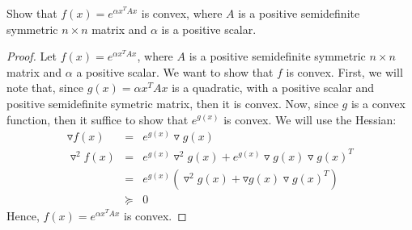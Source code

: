 \begin{prob}[2.1]
  Show that $f(x) = e^{\alpha x^{T}Ax}$ is convex, where $A$ is a 
  positive semidefinite symmetric $n \times n$ matrix and $\alpha$
  is a positive scalar.
\end{prob}
\begin{proof}
  Let $f(x) = e^{\alpha x^{T}Ax}$, where $A$ is a positive semidefinite symmetric
  $n \times n$ matrix and $\alpha$ a positive scalar. We want to show that $f$
  is convex.  First, we will note that, since $g(x) = \alpha x^{T}Ax$ is a quadratic, with a positive scalar and positive semidefinite symetric matrix, then it is convex.  Now, since $g$ is a convex function, then it suffice to show that $e^{g(x)}$ is convex.  We will use the Hessian:
  \begin{eqnarray*}
    \triangledown f(x) &=& e^{g(x)} \triangledown g(x)\\
    \triangledown^{2} f(x) &=& e^{g(x)} \triangledown^{2} g(x) + e^{g(x)} \triangledown g(x) \triangledown g(x)^{T}\\
    &=& e^{g(x)} (\triangledown^{2} g(x) + \triangledown g(x) \triangledown g(x)^{T})\\
    &\succeq& 0
  \end{eqnarray*}
  Hence, $f(x) = e^{\alpha x^{T}Ax}$ is convex.
  
\end{proof}
